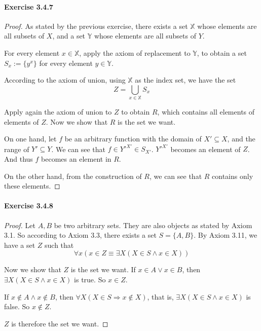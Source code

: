 \paragraph{Exercise 3.4.7} \label{exercise3.4.7}
\begin{proof}
As stated by the previous exercise, there exists a set $\mathbb{X}$ whose elements are all subsets of 
$X$, and a set $\mathbb{Y}$ whose elements are all subsets of $Y$.

For every element $x \in \mathbb{X}$, apply the axiom of replacement to $\mathbb{Y}$, to obtain a set 
$S_x := \{y^x\}$ for every element $y \in \mathbb{Y}$. 

According to the axiom of union, using $\mathbb{X}$ as the index set, we have the set
\[
Z = \bigcup_{x \in \mathbb{X}} S_x
\]

Apply again the axiom of union to $Z$ to obtain $R$, which contains all elements of elements of $Z$. Now 
we show that $R$ is the set we want.

On one hand, let $f$ be an arbitrary function with the domain of $X' \subseteq X$, and the range of $Y' 
\subseteq Y$. We can see that $f \in {Y'}^{X'} \in S_{X'}$. ${Y'}^{X'}$ becomes an element of $Z$. And 
thus $f$ becomes an element in $R$. 

On the other hand, from the construction of $R$, we can see that $R$ contains only these elements.

\end{proof}

\paragraph{Exercise 3.4.8} \label{exercise3.4.8}
\begin{proof}
Let $A,B$ be two arbitrary sets. They are also objects as stated by Axiom 3.1. So according to 
Axiom 3.3, there exists a set $S=\{A,B\}$. By Axiom 3.11, we have a set $Z$ such that 
\[
\forall x(x \in Z \equiv \exists X(X \in S \wedge x \in X))
\]

Now we show that $Z$ is the set we want. If $x \in A \vee x \in B$, then 
$\exists X(X \in S \wedge x \in X)$ is true. So $x \in Z$.

If $x \notin A \wedge x \notin B$, then $\forall X(X \in S \Longrightarrow x \notin X)$, that is, 
$\exists X(X \in S \wedge x \in X)$ is false. So $x \notin Z$.

$Z$ is therefore the set we want. 
\end{proof}

